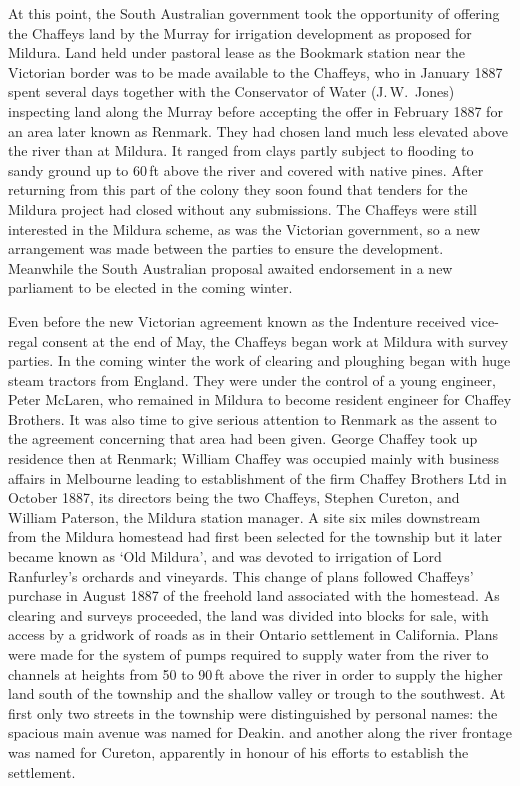 At this point, the South Australian government took the opportunity of
offering the Chaffeys land by the Murray for irrigation development as
proposed for Mildura.  Land held under pastoral lease as the Bookmark
station near the Victorian border was to be made available to the
Chaffeys, who in January 1887 spent several days together with the
Conservator of Water (J.\,W.~Jones) inspecting land along the Murray
before accepting the offer in February 1887 for an area later known as
Renmark.  They had chosen land much less elevated above the river than
at Mildura.  It ranged from clays partly subject to flooding to sandy
ground up to 60\,ft above the river and covered with native pines.
After returning from this part of the colony they soon found that
tenders for the Mildura project had closed without any submissions.
The Chaffeys were still interested in the Mildura scheme, as was the
Victorian government, so a new arrangement was made between the
parties to ensure the development.  Meanwhile the South Australian
proposal awaited endorsement in a new parliament to be elected in the
coming winter.

Even before the new Victorian agreement known as the Indenture
received vice-regal consent at the end of May, the Chaffeys began work
at Mildura with survey parties.  In the coming winter the work of
clearing and ploughing began with huge steam tractors from England.
They were under the control of a young engineer, Peter McLaren, who
remained in Mildura to become resident engineer for Chaffey Brothers.
It was also time to give serious attention to Renmark as the assent to
the agreement concerning that area had been given.  George Chaffey
took up residence then at Renmark; William Chaffey was occupied mainly
with business affairs in Melbourne leading to establishment of the
firm Chaffey Brothers Ltd in October 1887, its directors being the two
Chaffeys, Stephen Cureton, and William Paterson, the Mildura station
manager.  A site six miles downstream from the Mildura homestead had
first been selected for the township but it later became known as `Old
Mildura', and was devoted to irrigation of Lord Ranfurley's orchards
and vineyards.  This change of plans followed Chaffeys' purchase in
August 1887 of the freehold land associated with the homestead.  As
clearing and surveys proceeded, the land was divided into blocks for
sale, with access by a gridwork of roads as in their Ontario
settlement in California.  Plans were made for the system of pumps
required to supply water from the river to channels at heights from 50
to 90\,ft above the river in order to supply the higher land south of
the township and the shallow valley or trough to the southwest.  At
first only two streets in the township were distinguished by personal
names: the spacious main avenue was named for Deakin. and another
along the river frontage was named for Cureton, apparently in honour
of his efforts to establish the settlement.


